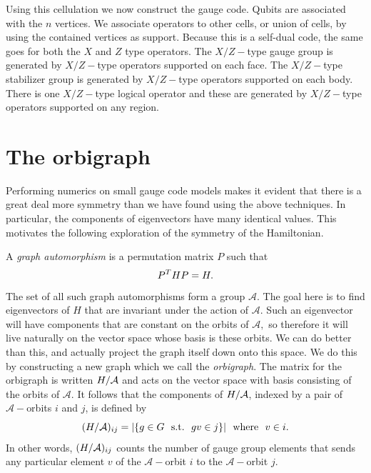 Using this cellulation we now construct the gauge code.
Qubits are associated with the $n$ vertices.
We associate operators to other cells, or union of cells,
by using the contained vertices as support.
Because this is a self-dual code, the same goes for
both the $X$ and $Z$ type operators.
The $X/Z-$type gauge group is generated by
$X/Z-$type operators supported on each face.
The $X/Z-$type stabilizer group is generated by
$X/Z-$type operators supported on each body.
There is one $X/Z-$type logical operator and these
are generated by
$X/Z-$type operators supported on any region.

%


\section{The orbigraph}

Performing numerics on small gauge code models makes
it evident that there is a great deal more symmetry than
we have found using the above techniques.
In particular, the components of eigenvectors 
have many identical values.
This motivates the following exploration of the symmetry 
of the Hamiltonian.

\def\auto{\mathcal{A}}

A \emph{graph automorphism} is a permutation matrix $P$
such that 
$$P^T H P = H.$$
The set of all such graph automorphisms 
form a group $\auto$.
The goal here is to find eigenvectors of $H$ that are
invariant under the action of $\auto.$
Such an eigenvector will have components that
are constant on the orbits of $\auto,$
so therefore it will live naturally on the
vector space whose basis is these orbits.
We can do better than this, and actually 
project the graph itself down onto this space.
We do this by constructing a new graph
which we call the \emph{orbigraph}.
The matrix for the orbigraph is written $\Ham/\auto$
and acts on the vector space with basis consisting
of the orbits of $\auto.$
It follows that the components of $\Ham/\auto$,
indexed by a pair of $\auto-$orbits $i$ and $j$, is defined by
$$
    (\Ham/\auto)_{ij} = |\{ g\in G \smbox{s.t.} gv \in j \}| \smbox{where}v\in i.
$$
In other words, 
$(\Ham/\auto)_{ij} $ counts the number of gauge group
elements that sends any particular element $v$ of the 
$\auto-$orbit $i$ to the $\auto-$orbit $j.$

